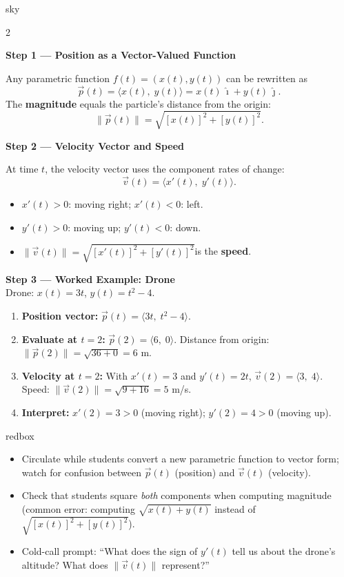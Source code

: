 \documentclass[10pt]{article}
\begin{document}
\begin{skillbox}[Lesson]{sky}
\begin{multicols}{2}

\textbf{Step 1 --- Position as a Vector-Valued Function}

Any parametric function $f(t)=(x(t),y(t))$ can be rewritten as
\[
  \vec{p}(t) = \langle x(t),\; y(t)\rangle
             = x(t)\,\hat{\imath} + y(t)\,\hat{\jmath}.
\]
The \textbf{magnitude} equals the particle's distance from the origin:
\[
  \|\vec{p}(t)\| = \sqrt{[x(t)]^2 + [y(t)]^2}.
\]

\columnbreak

\textbf{Step 2 --- Velocity Vector and Speed}

At time $t$, the velocity vector uses the component rates of change:
\[
  \vec{v}(t) = \langle x'(t),\; y'(t)\rangle.
\]
\begin{itemize}
  \item $x'(t)>0$: moving right; $x'(t)<0$: left.
  \item $y'(t)>0$: moving up; $y'(t)<0$: down.
  \item $\|\vec{v}(t)\|=\sqrt{[x'(t)]^2+[y'(t)]^2}$\quad is the \textbf{speed}.
\end{itemize}

\end{multicols}

\medskip
\textbf{Step 3 --- Worked Example: Drone}\\[3pt]
Drone: $x(t)=3t$, $y(t)=t^{2}-4$.

\begin{enumerate}
  \item \textbf{Position vector:} $\vec{p}(t)=\langle 3t,\;t^{2}-4\rangle$.
  \item \textbf{Evaluate at $t=2$:} $\vec{p}(2)=\langle 6,\;0\rangle$.
        Distance from origin: $\|\vec{p}(2)\|=\sqrt{36+0}=6$ m.
  \item \textbf{Velocity at $t=2$:} With $x'(t)=3$ and $y'(t)=2t$,
        $\vec{v}(2)=\langle 3,\;4\rangle$.
        Speed: $\|\vec{v}(2)\|=\sqrt{9+16}=5$ m/s.
  \item \textbf{Interpret:} $x'(2)=3>0$ (moving right); $y'(2)=4>0$ (moving up).
\end{enumerate}
\end{skillbox}

\begin{skillbox}{redbox}
\begin{itemize}
  \item Circulate while students convert a new parametric function to vector form;
        watch for confusion between $\vec{p}(t)$ (position) and $\vec{v}(t)$ (velocity).
  \item Check that students square \emph{both} components when computing magnitude
        (common error: computing $\sqrt{x(t)+y(t)}$ instead of
        $\sqrt{[x(t)]^2+[y(t)]^2}$).
  \item Cold-call prompt: ``What does the sign of $y'(t)$ tell us about the drone's
        altitude?  What does $\|\vec{v}(t)\|$ represent?''
\end{itemize}
\end{skillbox}
\end{document}
